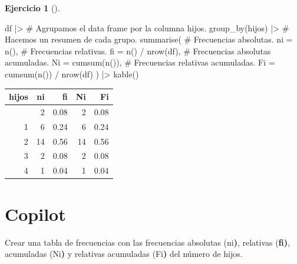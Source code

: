 \documentclass[
  a4paper,
]{scrreport}
\newenvironment{Shaded}{\begin{snugshade}}{\end{snugshade}}
\newcommand{\AttributeTok}[1]{\textcolor[rgb]{0.40,0.45,0.13}{#1}}
\newcommand{\CommentTok}[1]{\textcolor[rgb]{0.37,0.37,0.37}{#1}}
\newcommand{\ControlFlowTok}[1]{\textcolor[rgb]{0.00,0.23,0.31}{\textbf{#1}}}
\newcommand{\ErrorTok}[1]{\textcolor[rgb]{0.68,0.00,0.00}{#1}}
\newcommand{\ExtensionTok}[1]{\textcolor[rgb]{0.00,0.23,0.31}{#1}}
\newcommand{\FunctionTok}[1]{\textcolor[rgb]{0.28,0.35,0.67}{#1}}
\newcommand{\KeywordTok}[1]{\textcolor[rgb]{0.00,0.23,0.31}{\textbf{#1}}}
\newcommand{\NormalTok}[1]{\textcolor[rgb]{0.00,0.23,0.31}{#1}}
\newcommand{\SpecialCharTok}[1]{\textcolor[rgb]{0.37,0.37,0.37}{#1}}
\theoremstyle{definition}
\newtheorem{exercise}{Ejercicio}[chapter]
\theoremstyle{remark}
\begin{document}
\begin{exercise}[]
\begin{enumerate}
\begin{tcolorbox}
\begin{Shaded}
\begin{Highlighting}[]
\NormalTok{df }\SpecialCharTok{|\textgreater{}}
    \CommentTok{\# Agrupamos el data frame por la columna hijos.}
    \FunctionTok{group\_by}\NormalTok{(hijos) }\SpecialCharTok{|\textgreater{}}
    \CommentTok{\# Hacemos un resumen de cada grupo.}
    \FunctionTok{summarise}\NormalTok{(}
        \CommentTok{\# Frecuencias absolutas.}
        \AttributeTok{ni =} \FunctionTok{n}\NormalTok{(),}
        \CommentTok{\# Frecuencias relativas.}
        \AttributeTok{fi =} \FunctionTok{n}\NormalTok{() }\SpecialCharTok{/} \FunctionTok{nrow}\NormalTok{(df),}
        \CommentTok{\# Frecuencias absolutas acumuladas.}
        \AttributeTok{Ni =} \FunctionTok{cumsum}\NormalTok{(}\FunctionTok{n}\NormalTok{()),}
        \CommentTok{\# Frecuencias relativas acumuladas.}
        \AttributeTok{Fi =} \FunctionTok{cumsum}\NormalTok{(}\FunctionTok{n}\NormalTok{()) }\SpecialCharTok{/} \FunctionTok{nrow}\NormalTok{(df)}
\NormalTok{    ) }\SpecialCharTok{|\textgreater{}} 
    \FunctionTok{kable}\NormalTok{()}
\end{Highlighting}
\end{Shaded}

  \begin{longtable}[]{@{}rrrrr@{}}
  \toprule\noalign{}
  hijos & ni & fi & Ni & Fi \\
  \midrule\noalign{}
  \endhead
  \bottomrule\noalign{}
  \endlastfoot
  0 & 2 & 0.08 & 2 & 0.08 \\
  1 & 6 & 0.24 & 6 & 0.24 \\
  2 & 14 & 0.56 & 14 & 0.56 \\
  3 & 2 & 0.08 & 2 & 0.08 \\
  4 & 1 & 0.04 & 1 & 0.04 \\
  \end{longtable}

  \section{Copilot}

\begin{Shaded}
\begin{Highlighting}[]
\ExtensionTok{Crear}\NormalTok{ una tabla de frecuencias con las frecuencias absolutas }\ErrorTok{(}\ExtensionTok{ni}\KeywordTok{)}\ExtensionTok{,}\NormalTok{ relativas  }\ErrorTok{(}\ControlFlowTok{fi}\KeywordTok{)}\ExtensionTok{,}\NormalTok{ acumuladas }\ErrorTok{(}\ExtensionTok{Ni}\KeywordTok{)} \ExtensionTok{y}\NormalTok{ relativas acumuladas }\ErrorTok{(}\ExtensionTok{Fi}\KeywordTok{)} \ExtensionTok{del}\NormalTok{ número de hijos.}
\end{Highlighting}
\end{Shaded}


\end{tcolorbox}
\end{enumerate}
\end{exercise}
\end{document}

